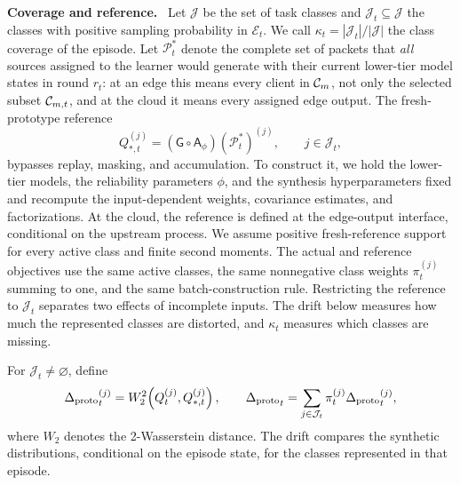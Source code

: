 \noindent\textbf{Coverage and reference.}~
Let $\mathcal J$ be the set of task classes and $\mathcal J_t\subseteq\mathcal J$ the classes with positive sampling probability in $\mathcal E_t$. We call $\kappa_t=|\mathcal J_t|/|\mathcal J|$ the class coverage of the episode. Let $\mathcal P_t^*$ denote the complete set of packets that \emph{all} sources assigned to the learner would generate with their current lower-tier model states in round $r_t$: at an edge this means every client in $\mathcal{C}_{m}$, not only the selected subset $\mathcal{C}_{m,t}$, and at the cloud it means every assigned edge output. The fresh-prototype reference
\begin{equation}
 Q_{*,t}^{(j)}=(\mathsf G\circ\mathsf A_\phi)(\mathcal P_t^*)^{(j)},
 \qquad j\in\mathcal J_t,
 \label{eq:fresh_reference}
\end{equation}
bypasses replay, masking, and accumulation. To construct it, we hold the lower-tier models, the reliability parameters $\phi$, and the synthesis hyperparameters fixed and recompute the input-dependent weights, covariance estimates, and factorizations. At the cloud, the reference is defined at the edge-output interface, conditional on the upstream process. We assume positive fresh-reference support for every active class and finite second moments. The actual and reference objectives use the same active classes, the same nonnegative class weights $\pi_t^{(j)}$ summing to one, and the same batch-construction rule. Restricting the reference to $\mathcal J_t$ separates two effects of incomplete inputs. The drift below measures how much the represented classes are distorted, and $\kappa_t$ measures which classes are missing.

\begin{definition}
\label{def:proto_drift}
For $\mathcal J_t\ne\varnothing$, define
\begin{equation}
{\Delta_{\mathrm{proto}}}_t^{(j)}=W_2^2\!\left(Q_t^{(j)},Q_{*,t}^{(j)}\right),
\qquad
{\Delta_{\mathrm{proto}}}_t=\sum_{j\in\mathcal J_t}\pi_t^{(j)}{\Delta_{\mathrm{proto}}}_t^{(j)},
 \label{eq:prototype_drift}
\end{equation}
where $W_2$ denotes the 2-Wasserstein distance. The drift compares the synthetic distributions, conditional on the episode state, for the classes represented in that episode.
\end{definition}

